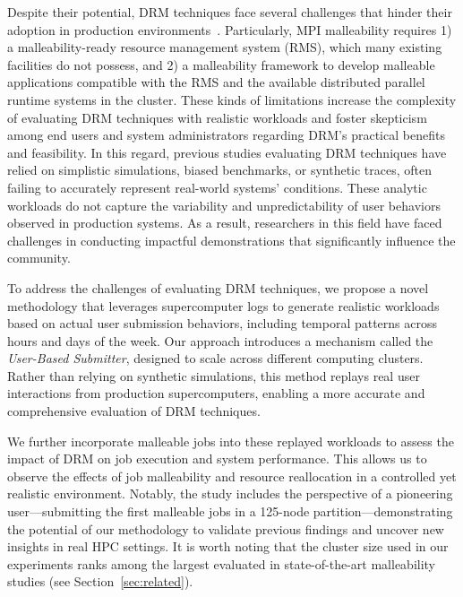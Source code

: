 \documentclass[a4paper,fleqn]{cas-dc}
\begin{document}
Despite their potential, DRM techniques face several challenges that hinder their adoption in production environments~\cite{iserte_resource_2025}.
Particularly, MPI malleability requires 1) a malleability-ready resource management system (RMS), which many existing facilities do not possess, and 2) a malleability framework to develop malleable applications compatible with the RMS and the available distributed parallel runtime systems in the cluster.
These kinds of limitations increase the complexity of evaluating DRM techniques with realistic workloads and foster skepticism among end users and system administrators regarding DRM's practical benefits and feasibility.
In this regard, previous studies evaluating DRM techniques have relied on simplistic simulations, biased benchmarks, or synthetic traces, often failing to accurately represent real-world systems' conditions. These analytic workloads do not capture the variability and unpredictability of user behaviors observed in production systems. As a result, researchers in this field have faced challenges in conducting impactful demonstrations that significantly influence the community.

To address the challenges of evaluating DRM techniques, we propose a novel methodology that leverages supercomputer logs to generate realistic workloads based on actual user submission behaviors, including temporal patterns across hours and days of the week. Our approach introduces a mechanism called the \textit{User-Based Submitter}, designed to scale across different computing clusters. Rather than relying on synthetic simulations, this method replays real user interactions from production supercomputers, enabling a more accurate and comprehensive evaluation of DRM techniques.

We further incorporate malleable jobs into these replayed workloads to assess the impact of DRM on job execution and system performance. This allows us to observe the effects of job malleability and resource reallocation in a controlled yet realistic environment. Notably, the study includes the perspective of a pioneering user—submitting the first malleable jobs in a 125-node partition—demonstrating the potential of our methodology to validate previous findings and uncover new insights in real HPC settings. It is worth noting that the cluster size used in our experiments ranks among the largest evaluated in state-of-the-art malleability studies (see Section~\ref{sec:related}).
\end{document}
